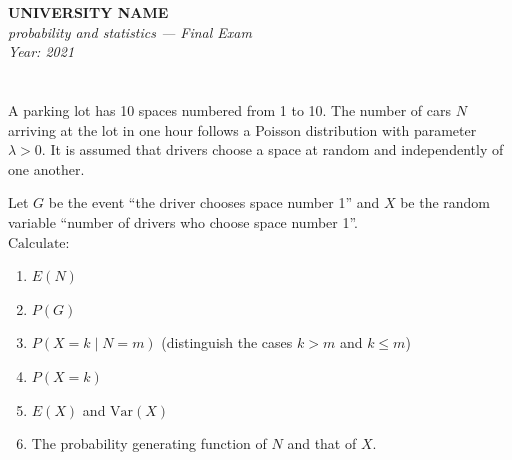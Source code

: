 \documentclass[12pt]{article}
\begin{document}
\begin{center}
  \Large\textbf{UNIVERSITY NAME} \\[1em]
  \large\textit{probability and statistics — Final Exam} \\[0.5em]
  \large\textit{Year: 2021} \\[2em]
\end{center}

\vspace{0.5cm}

\section{}
A parking lot has 10 spaces numbered from 1 to 10. The number of cars \( N \) arriving at the lot in one hour follows a Poisson distribution with parameter \( \lambda > 0 \). It is assumed that drivers choose a space at random and independently of one another.

Let \( G \) be the event “the driver chooses space number 1” and \( X \) be the random variable “number of drivers who choose space number 1”.
\\
$\text{Calculate}$:
\begin{enumerate}
    \item \( E(N) \)
    \item \( P(G) \)
    \item \( P(X = k \mid N = m) \) (distinguish the cases \( k > m \) and \( k \leq m \))
    \item \( P(X = k) \)
    \item \( E(X) \) and \( \text{Var}(X) \)
    \item The probability generating function of \( N \) and that of \( X \).
\end{enumerate}
\end{document}
